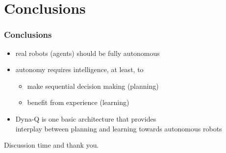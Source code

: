 \section{Conclusions}

\begin{frame}
\frametitle{Conclusions}
\begin{itemize}
  \item real robots (agents) should be fully autonomous \pause
  \item autonomy requires intelligence, at least, to \pause
    \begin{itemize}
      \item make sequential decision making (planning) \pause
      \item benefit from experience (learning)
    \end{itemize}
    \pause
  \item Dyna-Q is one basic architecture that provides \\
    interplay between planning and learning towards autonomous robots
\end{itemize}
\end{frame}

\begin{frame}
\Huge{\centerline{Discussion time and thank you.}}
\end{frame}